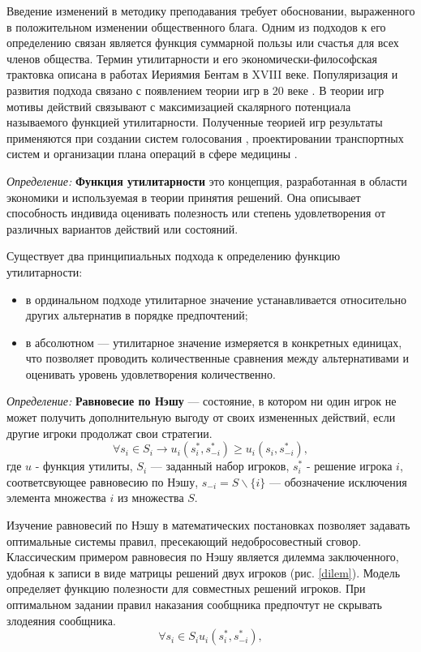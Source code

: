 Введение изменений в методику преподавания требует обосновании, выраженного в положительном изменении общественного блага.
Одним из подходов к его определению связан является функция суммарной пользы или счастья для всех членов общества.
Термин утилитарности и его экономически-философская трактовка описана в работах Иериямия Бентам \cite{bentham1996collected} в XVIII веке.
Популяризация и развития подхода связано с появлением теории игр в 20 веке \cite{nash1950bargaining} \cite{riley1981optimal} \cite{hurwicz1960optimality}.
В теории игр мотивы действий связывают с максимизацией скалярного потенциала называемого функцией утилитарности.
Полученные теорией игр результаты применяются при создании систем голосования \cite{gibbard1973manipulation},
проектировании транспортных систем \cite{harris1955fundamentals} и организации плана операций в сфере медицины \cite{roth2004kidney}.

\textit{Определение:} \textbf{Функция утилитарности} это концепция, разработанная в области экономики и используемая в теории принятия решений.
Она описывает способность индивида оценивать полезность или степень удовлетворения от различных вариантов действий или состояний.

Существует два принципиальных подхода к определению функцию утилитарности:\begin{itemize}
    \item в ординальном подходе утилитарное значение устанавливается относительно других альтернатив в порядке предпочтений; 
    \item в абсолютном --- утилитарное значение измеряется в конкретных единицах, что позволяет проводить количественные сравнения между 
    альтернативами и оценивать уровень удовлетворения количественно.
\end{itemize}

\textit{Определение:} \textbf{Равновесие по Нэшу} \cite{nash1950bargaining} --- состояние, в котором ни один игрок не может получить дополнительную выгоду от своих измененных действий, 
если другие игроки продолжат свои стратегии.
\begin{equation}
    \forall s_i \in S_i \rightarrow u_i(s_i^*,s^*_{-i}) \ge u_i(s_i,s_{-i}^*),
\end{equation}
где $u$ - функция утилиты, $S_i$ --- заданный набор игроков, $s_i^*$ - решение игрока $i$, соответсвующее равновесию по Нэшу,
$s_{-i} = S \backslash \{i\}$ --- обозначение исключения элемента множества $i$ из множества $S$.

Изучение равновесий по Нэшу в математических постановках позволяет задавать оптимальные системы правил, пресекающий
недобросовестный сговор. Классическим примером равновесия по Нэшу является дилемма заключенного, удобная к записи в виде
матрицы решений двух игроков (рис. \ref{dilem}). Модель определяет функцию полезности для совместных решений игроков.
При оптимальном задании правил наказания сообщника предпочтут не скрывать злодеяния сообщника.
\begin{equation}
    \forall s_i \in S_i u_i(s_i^*,s^*_{-i}),
\end{equation}

